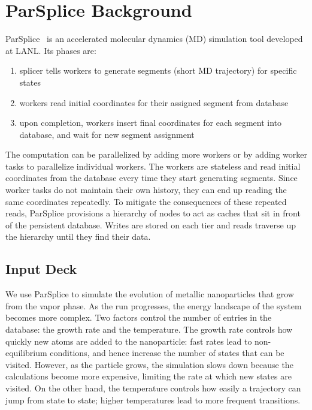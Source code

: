 \section{ParSplice Background}
\label{sec:parsplice}

ParSplice~\cite{perez:jctc20150parsplice} is an accelerated molecular dynamics
(MD) simulation tool developed at LANL. Its phases are:

\begin{enumerate}

  \item splicer tells workers to generate segments (short MD trajectory) for
  specific states

  \item workers read initial coordinates for their assigned segment from database 

  \item upon completion, workers insert final coordinates for each segment into
  database, and wait for new segment assignment

\end{enumerate}

The computation can be parallelized by adding more workers or by adding worker
tasks to parallelize individual workers.  The workers are stateless and read
initial coordinates from the database every time they start generating
segments. Since worker tasks do not maintain their own history, they can end up
reading the same coordinates repeatedly. To mitigate the consequences of these
repeated reads, ParSplice provisions a hierarchy of nodes to act as caches that
sit in front of the persistent database.  Writes are stored on each tier and
reads traverse up the hierarchy until they find their data. 

\subsection*{Input Deck}

We use ParSplice to simulate the evolution of metallic nanoparticles that grow
from the vapor phase. As the run progresses, the energy landscape of the system
becomes more complex. Two factors control the number of entries in the
database: the growth rate and the temperature. The growth rate controls how
quickly new atoms are added to the nanoparticle: fast rates lead to
non-equilibrium conditions, and hence increase the number of states that can be
visited. However, as the particle grows, the simulation slows down because the
calculations become more expensive, limiting the rate at which new states are
visited. On the other hand, the temperature controls how easily a trajectory
can jump from state to state; higher temperatures lead to more frequent
transitions.

